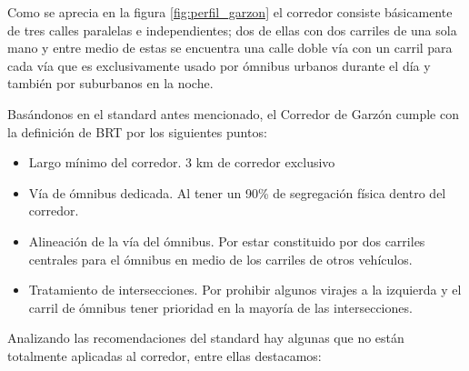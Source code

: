 Como se aprecia en la figura \ref{fig:perfil_garzon} el corredor consiste básicamente de tres calles paralelas e independientes; dos de ellas con dos carriles de una sola mano y entre medio de estas se encuentra una calle doble vía con un carril para cada vía que es exclusivamente usado por ómnibus urbanos durante el día y también por suburbanos en la noche.


Basándonos en el standard antes mencionado, el Corredor de Garzón cumple con la definición de BRT por los siguientes puntos:
\begin{itemize}
	\item Largo mínimo del corredor. 3 km de corredor exclusivo 
	\item Vía de ómnibus dedicada. Al tener un 90\% de segregación física dentro del corredor.
	\item Alineación de la vía del ómnibus. Por estar constituido por dos carriles centrales para el ómnibus en medio de los carriles de otros vehículos.
	\item Tratamiento de intersecciones. Por prohibir algunos virajes a la izquierda y el carril de ómnibus tener prioridad en la mayoría de las intersecciones.
\end{itemize}


Analizando las recomendaciones del standard hay algunas que no están totalmente aplicadas al corredor, entre ellas destacamos:

